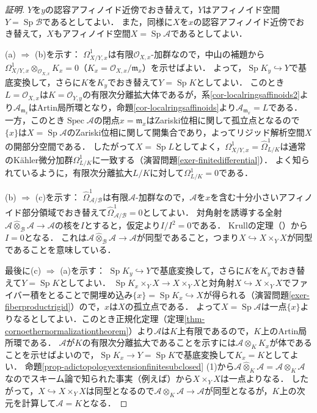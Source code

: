 \documentclass[a4paper,12pt, dvipdfmx]{jsbook}
\def\O{\mathscr{O}}
\def\m{\mathfrak{m}}
\def\Spec{\mathop{\mathrm{Spec}}\nolimits}
\def\Sp{\mathop{\mathrm{Sp}}\nolimits}
\theoremstyle{plain}
\theoremstyle{definition}
\begin{document}
\begin{proof}[証明]
$Y$を$y$の認容アフィノイド近傍でおき替えて，$Y$はアフィノイド空間$Y=\Sp\mathcal{B}$であるとしてよい．
また，同様に$X$を$x$の認容アフィノイド近傍でおき替えて，$X$もアフィノイド空間$X=\Sp\mathcal{A}$であるとしてよい．

(a) $\Rightarrow$ (b)を示す： $\Omega^1_{X/Y,x}$は有限$\O_{X,x}$-加群なので，中山の補題から$\Omega^1_{X/Y,x}\otimes_{\O_{X,x}}K_x=0$（$K_x=\O_{X,x}/\m_x$）を示せばよい．
よって，$\Sp K_y\hookrightarrow Y$で基底変換して，さらに$K$を$K_y$でおき替えて$Y=\Sp K$としてよい．
このとき$L=\O_{X,x}$は$K=\O_{Y,y}$の有限次分離拡大体であるが，系\ref{cor-localringsaffinoids2}より$\mathcal{A}_{\m_x}$はArtin局所環となり，命題\ref{cor-localringsaffinoids}より$\mathcal{A}_{\m_x}=L$である．
一方，このとき$\Spec\mathcal{A}$の閉点$x=\m_x$はZariski位相に関して孤立点となるので$\{x\}$は$X=\Sp\mathcal{A}$のZariski位相に関して開集合であり，よってリジッド解析空間$X$の開部分空間である．
したがって$X=\Sp L$としてよく，$\Omega^1_{X/Y,x}=\widehat{\Omega}^1_{L/K}$は通常のK\"ahler微分加群$\Omega^1_{L/K}$に一致する（演習問題\ref{exer-finitedifferential}）．
よく知られているように，有限次分離拡大$L/K$に対して$\Omega^1_{L/K}=0$である．

(b) $\Rightarrow$ (c)を示す： $\widehat{\Omega}^1_{\mathcal{A}/\mathcal{B}}$は有限$\mathcal{A}$-加群なので，$\mathcal{A}$を$x$を含む十分小さいアフィノイド部分領域でおき替えて$\widehat{\Omega}^1_{\mathcal{A}/\mathcal{B}}=0$としてよい．
対角射を誘導する全射$\mathcal{A}\widehat{\otimes}_{\mathcal{B}}\mathcal{A}\rightarrow\mathcal{A}$の核を$I$とすると，仮定より$I/I^2=0$である．
Krullの定理（\cite[Theorem 8.9]{Matsu}）から$I=0$となる．
これは$\mathcal{A}\widehat{\otimes}_{\mathcal{B}}\mathcal{A}\rightarrow\mathcal{A}$が同型であること，つまり$X\hookrightarrow X\times_YX$が同型であることを意味している．

最後に(c) $\Rightarrow$ (a)を示す： $\Sp K_y\hookrightarrow Y$で基底変換して，さらに$K$を$K_y$でおき替えて$Y=\Sp K$としてよい．
$\Sp K_x\times_YX\rightarrow X\times_YX$と対角射$X\hookrightarrow X\times_YX$でファイバー積をとることで開埋め込み$\{x\}=\Sp K_x\hookrightarrow X$が得られる（演習問題\ref{exer-fiberproductrigid}）ので，$x$は$X$の孤立点である．
よって$X=\Sp\mathcal{A}$は一点$\{x\}$よりなるとしてよい．このとき正規化定理（定理\ref{thm-cornoethernormalizationtheorem}）より$\mathcal{A}$は$K$上有限であるので，$K$上のArtin局所環である．
$\mathcal{A}$が$K$の有限次分離拡大であることを示すには$\mathcal{A}\otimes_KK_x$が体であることを示せばよいので，$\Sp K_x\rightarrow Y=\Sp K$で基底変換して$K_x=K$としてよい．
命題\ref{prop-adictopologyextensionfinitesubclosed} (1)から$\mathcal{A}\widehat{\otimes}_K\mathcal{A}=\mathcal{A}\otimes_K\mathcal{A}$なのでスキーム論で知られた事実（例えば\cite[$\mathbf{I}$, (3.4.9) (v)]{EGA}）から$X\times_YX$は一点よりなる．
したがって，$X\hookrightarrow X\times_YX$は同型となるので$\mathcal{A}\otimes_K\mathcal{A}\rightarrow\mathcal{A}$が同型となるが，$K$上の次元を計算して$\mathcal{A}=K$となる．
\end{proof}
\end{document}
